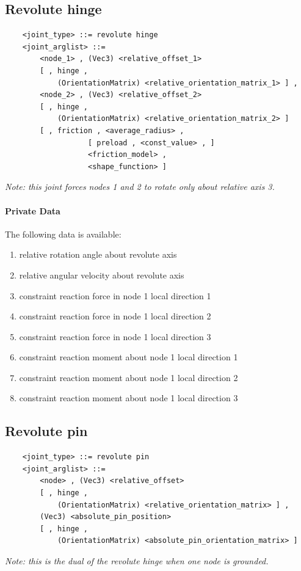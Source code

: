 \subsection{Revolute hinge}
\begin{verbatim}
    <joint_type> ::= revolute hinge
    <joint_arglist> ::= 
        <node_1> , (Vec3) <relative_offset_1> 
        [ , hinge , 
            (OrientationMatrix) <relative_orientation_matrix_1> ] ,
        <node_2> , (Vec3) <relative_offset_2>
        [ , hinge , 
            (OrientationMatrix) <relative_orientation_matrix_2> ]
        [ , friction , <average_radius> , 
                   [ preload , <const_value> , ]
                   <friction_model> , 
                   <shape_function> ]
\end{verbatim}
{\em
    Note: this joint forces nodes 1 and 2 to rotate only about relative 
    axis 3.
}

\paragraph{Private Data}
The following data is available:
\begin{enumerate}
\item {} relative rotation angle about revolute axis
\item {} relative angular velocity about revolute axis
\item {} constraint reaction force in node 1 local direction 1
\item {} constraint reaction force in node 1 local direction 2
\item {} constraint reaction force in node 1 local direction 3
\item {} constraint reaction moment about node 1 local direction 1
\item {} constraint reaction moment about node 1 local direction 2
\item {} constraint reaction moment about node 1 local direction 3
\end{enumerate}




\subsection{Revolute pin}
\begin{verbatim}
    <joint_type> ::= revolute pin
    <joint_arglist> ::= 
        <node> , (Vec3) <relative_offset>
        [ , hinge , 
            (OrientationMatrix) <relative_orientation_matrix> ] ,
        (Vec3) <absolute_pin_position>
        [ , hinge , 
            (OrientationMatrix) <absolute_pin_orientation_matrix> ]
\end{verbatim}
{\em
    Note: this is the dual of the revolute hinge when one node is grounded.
}

